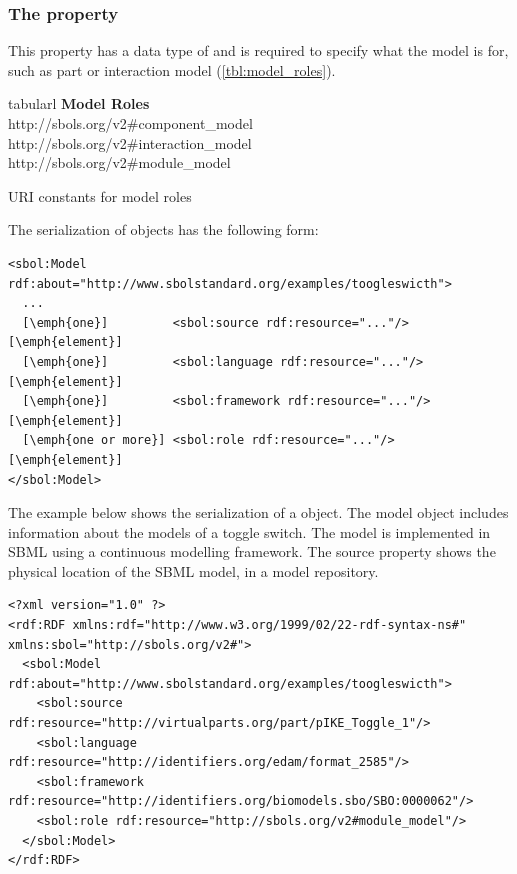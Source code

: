 \subsubsection*{ The  property}
This property has a data type of  and is required to specify what the model is for, such as part or interaction model (\ref{tbl:model_roles}).

\begin{table}[ht]
  \begin{edtable}{tabular}{l}
    \toprule
    \textbf{Model Roles}  \\
    \midrule
    http://sbols.org/v2\#component\_model\\
    http://sbols.org/v2\#interaction\_model\\
    http://sbols.org/v2\#module\_model\\    
    \bottomrule
  \end{edtable}
  \caption{URI constants for model roles}
  \label{tbl:model_roles}
\end{table}

The serialization of  objects has the following form:

\begin{lstlisting}
<sbol:Model rdf:about="http://www.sbolstandard.org/examples/toogleswicth">
  ...
  [\emph{one}]         <sbol:source rdf:resource="..."/> [\emph{element}]
  [\emph{one}]         <sbol:language rdf:resource="..."/> [\emph{element}]
  [\emph{one}]         <sbol:framework rdf:resource="..."/> [\emph{element}]
  [\emph{one or more}] <sbol:role rdf:resource="..."/> [\emph{element}]
</sbol:Model>
\end{lstlisting}

The example below shows the serialization of a  object. The model object includes information about the models of a toggle switch. The model is implemented in SBML using a continuous modelling framework. The source property shows the physical location of the SBML model, in a model repository. 
\begin{lstlisting}
<?xml version="1.0" ?>
<rdf:RDF xmlns:rdf="http://www.w3.org/1999/02/22-rdf-syntax-ns#" xmlns:sbol="http://sbols.org/v2#">
  <sbol:Model rdf:about="http://www.sbolstandard.org/examples/toogleswicth">
    <sbol:source rdf:resource="http://virtualparts.org/part/pIKE_Toggle_1"/>
    <sbol:language rdf:resource="http://identifiers.org/edam/format_2585"/>
    <sbol:framework rdf:resource="http://identifiers.org/biomodels.sbo/SBO:0000062"/>
    <sbol:role rdf:resource="http://sbols.org/v2#module_model"/>
  </sbol:Model>
</rdf:RDF>

\end{lstlisting}
\label{ser:Model}




